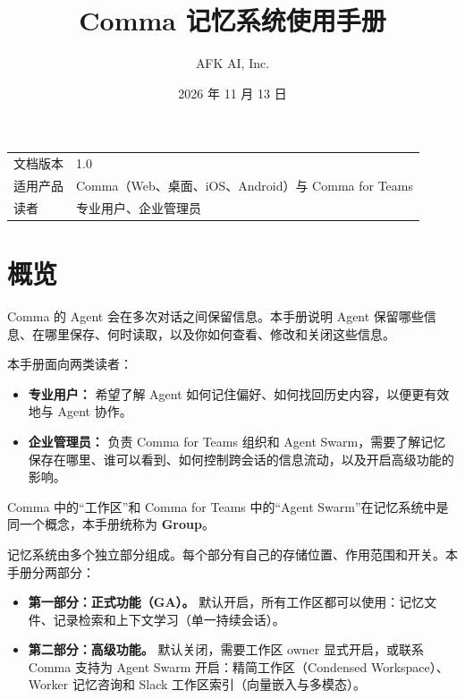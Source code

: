 \documentclass[UTF8,a4paper,11pt]{ctexart}
\title{\Huge Comma 记忆系统使用手册}
\author{AFK AI, Inc.}
\date{2026 年 11 月 13 日}
\begin{document}
\maketitle
\thispagestyle{empty}

\vfill
\begin{center}
\begin{tabular}{ll}
\toprule
文档版本 & 1.0 \\
适用产品 & Comma（Web、桌面、iOS、Android）与 Comma for Teams \\
读者 & 专业用户、企业管理员 \\
\bottomrule
\end{tabular}
\end{center}
\vfill

\newpage
\tableofcontents
\newpage

\section{概览}

Comma 的 Agent 会在多次对话之间保留信息。本手册说明 Agent 保留哪些信息、在哪里保存、何时读取，以及你如何查看、修改和关闭这些信息。

本手册面向两类读者：

\begin{itemize}
  \item \textbf{专业用户：} 希望了解 Agent 如何记住偏好、如何找回历史内容，以便更有效地与 Agent 协作。
  \item \textbf{企业管理员：} 负责 Comma for Teams 组织和 Agent Swarm，需要了解记忆保存在哪里、谁可以看到、如何控制跨会话的信息流动，以及开启高级功能的影响。
\end{itemize}

Comma 中的“工作区”和 Comma for Teams 中的“Agent Swarm”在记忆系统中是同一个概念，本手册统称为 \textbf{Group}。

记忆系统由多个独立部分组成。每个部分有自己的存储位置、作用范围和开关。本手册分两部分：

\begin{itemize}
  \item \textbf{第一部分：正式功能（GA）。} 默认开启，所有工作区都可以使用：记忆文件、记录检索和上下文学习（单一持续会话）。
  \item \textbf{第二部分：高级功能。} 默认关闭，需要工作区 owner 显式开启，或联系 Comma 支持为 Agent Swarm 开启：精简工作区（Condensed Workspace）、Worker 记忆咨询和 Slack 工作区索引（向量嵌入与多模态）。
\end{itemize}
\end{document}
